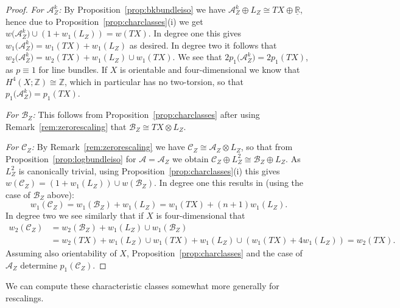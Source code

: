 \documentclass[10pt,a4paper]{amsart}
\numberwithin{equation}{section}
\begin{document}
\begin{proof}
{\it For $\mathcal{A}_Z^k$:} By Proposition~\ref{prop:bkbundleiso} we have $\mathcal{A}_Z^k \oplus L_Z \cong TX \oplus \underline{\mathbb{R}}$, hence due to Proposition~\ref{prop:charclasses}(i) we get $w\big(\mathcal{A}_Z^k\big)\cup (1 + w_1(L_Z)) = w(TX)$. In degree one this gives $w_1\big(\mathcal{A}_Z^k\big) = w_1(TX) + w_1(L_Z)$ as desired. In degree two it follows that $w_2\big(\mathcal{A}_Z^k\big) = w_2(TX) + w_1(L_Z) \cup w_1(TX)$. We see that $2 p_1\big(\mathcal{A}_Z^k\big) = 2 p_1(TX)$, as $p \equiv 1$ for line bundles. If $X$ is orientable and four-dimensional we know that $H^4(X;\mathbb{Z}) \cong \mathbb{Z}$, which in particular has no two-torsion, so that $p_1\big(\mathcal{A}_Z^k\big) = p_1(TX)$.

{\it For $\mathcal{B}_Z$:} This follows from Proposition~\ref{prop:charclasses} after using Remark~\ref{rem:zerorescaling} that $\mathcal{B}_Z \cong TX \otimes L_Z$.

{\it For $\mathcal{C}_Z$:} By Remark~\ref{rem:zerorescaling} we have $\mathcal{C}_Z \cong \mathcal{A}_Z \otimes L_Z$, so that from Proposition~\ref{prop:logbundleiso} for $\mathcal{A} = \mathcal{A}_Z$ we obtain $\mathcal{C}_Z \oplus L_Z^2 \cong \mathcal{B}_Z \oplus L_Z$. As $L_Z^2$ is canonically trivial, using Proposition~\ref{prop:charclasses}(i) this gives $w(\mathcal{C}_Z) = (1 + w_1(L_Z)) \cup w(\mathcal{B}_Z)$. In degree one this results in (using the case of $\mathcal{B}_Z$ above):
\begin{displaymath}
	w_1(\mathcal{C}_Z) = w_1(\mathcal{B}_Z) + w_1(L_Z) = w_1(TX) + (n+1)w_1(L_Z).
\end{displaymath}
In degree two we see similarly that if $X$ is four-dimensional that
\begin{align*}
w_2(\mathcal{C}_Z) &= w_2(\mathcal{B}_Z) + w_1(L_Z) \cup w_1(\mathcal{B}_Z) \\
&=w_2(TX) + w_1(L_Z) \cup w_1(TX) + w_1(L_Z) \cup (w_1(TX) + 4 w_1(L_Z)) = w_2(TX).
\end{align*}
Assuming also orientability of $X$, Proposition~\ref{prop:charclasses} and the case of $\mathcal{A}_Z$ determine $p_1(\mathcal{C}_Z)$.
\end{proof}

We can compute these characteristic classes somewhat more generally for rescalings.
\end{document}
